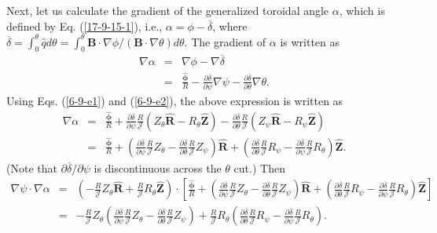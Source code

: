 \documentclass{llncs}
\newcommand{\tmmathbf}[1]{\ensuremath{\boldsymbol{#1}}}
\begin{document}
Next, let us calculate the gradient of the generalized toroidal angle
$\alpha$, which is defined by Eq. (\ref{17-9-15-1}), i.e., $\alpha = \phi -
\overline{\delta}$, where $\overline{\delta} = \int_0^{\theta} \hat{q} d
\theta = \int_0^{\theta} \mathbf{B} \cdot \nabla \phi / (\mathbf{B} \cdot
\nabla \theta) d \theta$. The gradient of $\alpha$ is written as
\begin{eqnarray}
  \nabla \alpha & = & \nabla \phi - \nabla \overline{\delta} \nonumber\\
  & = & \frac{\hat{\tmmathbf{\phi}}}{R} - \frac{\partial
  \overline{\delta}}{\partial \psi} \nabla \psi - \frac{\partial
  \overline{\delta}}{\partial \theta} \nabla \theta . 
\end{eqnarray}
Using Eqs. (\ref{6-9-e1}) and (\ref{6-9-e2}), the above expression is written
as
\begin{eqnarray}
  \nabla \alpha & = & \frac{\hat{\tmmathbf{\phi}}}{R} + \frac{\partial
  \overline{\delta}}{\partial \psi} \frac{R}{\mathcal{J}} (Z_{\theta}
  \hat{\mathbf{R}} - R_{\theta} \hat{\mathbf{Z}}) - \frac{\partial
  \overline{\delta}}{\partial \theta} \frac{R}{\mathcal{J}} (Z_{\psi}
  \hat{\mathbf{R}} - R_{\psi} \hat{\mathbf{Z}}) \nonumber\\
  & = & \frac{\hat{\tmmathbf{\phi}}}{R} + \left( \frac{\partial
  \overline{\delta}}{\partial \psi} \frac{R}{\mathcal{J}} Z_{\theta} -
  \frac{\partial \overline{\delta}}{\partial \theta} \frac{R}{\mathcal{J}}
  Z_{\psi} \right) \hat{\mathbf{R}} + \left( \frac{\partial
  \overline{\delta}}{\partial \theta} \frac{R}{\mathcal{J}} R_{\psi} -
  \frac{\partial \overline{\delta}}{\partial \psi} \frac{R}{\mathcal{J}}
  R_{\theta} \right) \hat{\mathbf{Z}} . 
\end{eqnarray}
(Note that $\partial \overline{\delta} / \partial \psi$ is discontinuous
across the $\theta$ cut.) Then
\begin{eqnarray}
  \nabla \psi \cdot \nabla \alpha & = & \left( - \frac{R}{\mathcal{J}}
  Z_{\theta} \hat{\mathbf{R}} + \frac{R}{\mathcal{J}} R_{\theta}
  \hat{\mathbf{Z}} \right) \cdot \left[ \frac{\hat{\tmmathbf{\phi}}}{R} +
  \left( \frac{\partial \overline{\delta}}{\partial \psi}
  \frac{R}{\mathcal{J}} Z_{\theta} - \frac{\partial
  \overline{\delta}}{\partial \theta} \frac{R}{\mathcal{J}} Z_{\psi} \right)
  \hat{\mathbf{R}} + \left( \frac{\partial \overline{\delta}}{\partial \theta}
  \frac{R}{\mathcal{J}} R_{\psi} - \frac{\partial \overline{\delta}}{\partial
  \psi} \frac{R}{\mathcal{J}} R_{\theta} \right) \hat{\mathbf{Z}} \right]
  \nonumber\\
  & = & - \frac{R}{\mathcal{J}} Z_{\theta} \left( \frac{\partial
  \overline{\delta}}{\partial \psi} \frac{R}{\mathcal{J}} Z_{\theta} -
  \frac{\partial \overline{\delta}}{\partial \theta} \frac{R}{\mathcal{J}}
  Z_{\psi} \right) + \frac{R}{\mathcal{J}} R_{\theta} \left( \frac{\partial
  \overline{\delta}}{\partial \theta} \frac{R}{\mathcal{J}} R_{\psi} -
  \frac{\partial \overline{\delta}}{\partial \psi} \frac{R}{\mathcal{J}}
  R_{\theta} \right) . 
\end{eqnarray}
\end{document}
